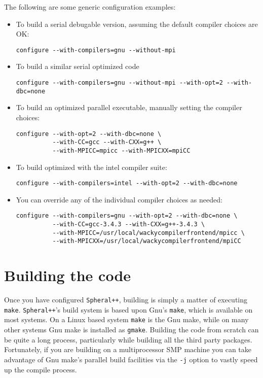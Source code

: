 \documentclass{article}
\newcommand{\Spheral}{{\tt Spheral++}}
\begin{document}
The following are some generic configuration examples:

\begin{itemize}
\item To build a serial debugable version, assuming the default compiler choices
are OK:
\begin{verbatim}
configure --with-compilers=gnu --without-mpi
\end{verbatim}

\item To build a similar serial optimized code
\begin{verbatim}
configure --with-compilers=gnu --without-mpi --with-opt=2 --with-dbc=none
\end{verbatim}

\item To build an optimized parallel executable, manually setting the compiler
choices:
\begin{verbatim}
configure --with-opt=2 --with-dbc=none \
          --with-CC=gcc --with-CXX=g++ \
          --with-MPICC=mpicc --with-MPICXX=mpiCC
\end{verbatim}

\item To build optimized with the intel compiler suite:
\begin{verbatim}
configure --with-compilers=intel --with-opt=2 --with-dbc=none
\end{verbatim}

\item You can override any of the individual compiler choices as needed:
\begin{verbatim}
configure --with-compilers=gnu --with-opt=2 --with-dbc=none \
          --with-CC=gcc-3.4.3 --with-CXX=g++-3.4.3 \
          --with-MPICC=/usr/local/wackycompilerfrontend/mpicc \
          --with-MPICXX=/usr/local/wackycompilerfrontend/mpiCC
\end{verbatim}

\end{itemize}

\section{Building the code}

Once you have configured \Spheral, building is simply a matter of executing {\tt
make}.  \Spheral's build system is based upon Gnu's \verb+make+, which is
available on most systems.  On a Linux based system \verb+make+ is the Gnu make,
while on many other systems Gnu make is installed as \verb+gmake+.  Building the
code from scratch can be quite a long process, particularly while building all
the third party packages.  Fortunately, if you are building on a multiprocessor
SMP machine you can take advantage of Gnu make's parallel build facilities via
the \verb+-j+ option to vastly speed up the compile process.
\end{document}
